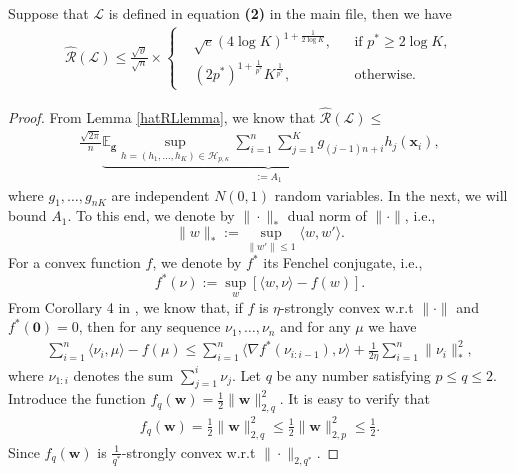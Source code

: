 \documentclass[10pt]{llncs}
\begin{document}
\begin{theorem}
  \label{Lemma-empRad}
Suppose that $\mathcal{L}$ is defined in equation \textbf{(2)} in the main file,
then we have
  \begin{align*}
    \hat{\mathcal{R}}(\mathcal{L})\leq \frac{\sqrt{\vartheta}}{\sqrt{n}}\times
      \left\{
      \begin{aligned}
      &\sqrt{e}(4\log K)^{1+\frac{1}{2\log K}}, &&\text{if } p^\ast\geq 2\log K,\\
      &(2p^\ast)^{1+\frac{1}{p^\ast}}K^{\frac{1}{p^\ast}}, &&\text{otherwise.}
      \end{aligned}
      \right.
  \end{align*}
\end{theorem}
\begin{proof}
From Lemma \ref{hatRLlemma}, we know that
$\hat{\mathcal{R}}(\mathcal{L})\leq $
\begin{align}
\label{eq-middle-mi}
  \frac{\sqrt{2\pi}}{n}\underbrace{\mathbb{E}_{\mathbf g}\sup_{h=(h_1,\ldots,h_K)
  \in\mathcal{H}_{p,\kappa}}\sum_{i=1}^n\sum_{j=1}^Kg_{(j-1)n+i}h_j(\mathbf x_i)}_{:=A_1},
\end{align}
  where $g_1,\ldots,g_{nK}$ are  independent $N(0,1)$ random variables.
  In the next, we will bound $A_1$.
  To this end,
 we denote by $\|\cdot\|_\ast$ dual norm of $\|\cdot\|$, i.e.,
$$\|w\|_\ast:=\sup_{\| w'\|\leq 1}\langle w, w'\rangle.$$
For a convex function $f$, we denote by $f^\ast$ its Fenchel
conjugate, i.e., $$f^\ast(\nu):=\sup_{w}\left[\langle w,\nu\rangle-f(w)\right].$$
  From Corollary 4 in \cite{Theodoros2000regularization}, we know that,
  if $f$ is $\eta$-strongly convex w.r.t $\|\cdot\|$ and $f^\ast(\mathbf 0)=0$, then for any sequence
  $\nu_1,\ldots,\nu_n$ and for any $\mu$ we have
  \begin{align*}
    \sum_{i=1}^n\langle \nu_i,\mu\rangle -f(\mu) \leq
    \sum_{i=1}^n\langle \nabla f^\ast(\nu_{i:i-1}),\nu\rangle +\frac{1}{2\eta}\sum_{i=1}^n\|\nu_i\|_\ast^2,
  \end{align*}
  where $\nu_{1:i}$ denotes the sum $\sum_{j=1}^i\nu_j$.
  Let $q$ be any number satisfying $p\leq q\leq 2$.
  Introduce the function $f_q(\mathbf w)=\frac{1}{2}\|\mathbf w\|_{2,q}^2$.
  It is easy to verify that
  \begin{align*}
    f_q(\mathbf w)=\frac{1}{2}\|\mathbf w\|_{2,q}^2\leq\frac{1}{2}\|\mathbf w\|_{2,p}^2\leq  \frac{1}{2}.
  \end{align*}
  Since  $f_q(\mathbf w)$ is $\frac{1}{q^\ast}$-strongly convex w.r.t  $\|\cdot\|_{2,q^\ast}$.

\end{proof}
\end{document}
